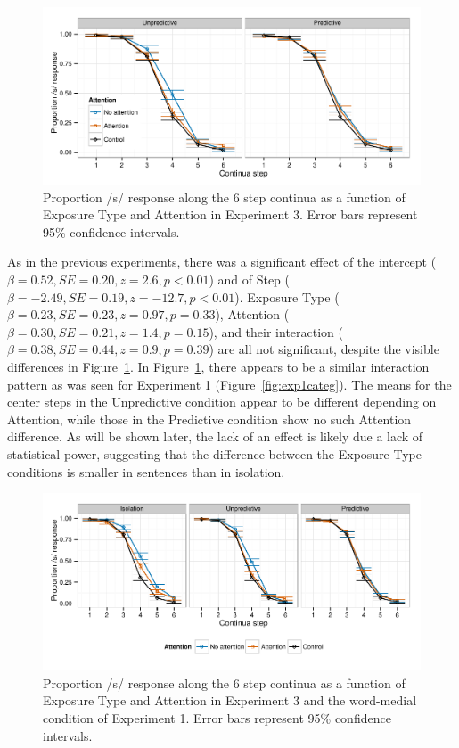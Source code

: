 \begin{figure}[!ht]
\caption{Proportion /s/ response along the 6 step continua as a function of Exposure Type and Attention in Experiment 3.  Error bars represent 95\% confidence intervals.}
\label{fig:exp3categ}
\begin{center}
\includegraphics[width=\textwidth]{graphs/exp3_categresults}
\end{center}
\end{figure}

As in the previous experiments, there was a significant effect of the intercept ($\beta = 0.52, SE = 0.20, z = 2.6, p < 0.01$) and of Step ($\beta = -2.49, SE = 0.19, z = -12.7, p < 0.01$).
Exposure Type ($\beta = 0.23, SE = 0.23, z = 0.97, p = 0.33$), Attention ($\beta = 0.30, SE = 0.21, z = 1.4, p = 0.15$), and their interaction ($\beta = 0.38, SE = 0.44, z = 0.9, p = 0.39$) are all not significant, despite the visible differences in Figure~\ref{fig:exp3categ}.
In Figure~\ref{fig:exp3categ}, there appears to be a similar interaction pattern as was seen for Experiment 1 (Figure~\ref{fig:exp1categ}).
The means for the center steps in the Unpredictive condition appear to be different depending on Attention, while those in the Predictive condition show no such Attention difference.
As will be shown later, the lack of an effect is likely due a lack of statistical power, suggesting that the difference between the Exposure Type conditions is smaller in sentences than in isolation.

\begin{figure}[!ht]
\caption{Proportion /s/ response along the 6 step continua as a function of Exposure Type and Attention in Experiment 3 and the word-medial condition of Experiment 1.  Error bars represent 95\% confidence intervals.}
\label{fig:exp23categ}
\begin{center}
\includegraphics[width=\textwidth]{graphs/exp23_categresults}
\end{center}
\end{figure}


